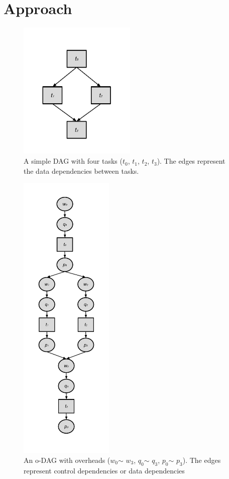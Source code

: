 \section{Approach}

\begin{figure}[h!]
	\centering
    \includegraphics[width=0.5\textwidth]{figures/model/dag.pdf}
    \caption{A simple DAG with four tasks ($t_0$, $t_1$, $t_2$, $t_3$). The edges represent the data dependencies between tasks.}
    \label{fig:model_dag}
\end{figure}

\begin{figure}[h!]
	\centering
    \includegraphics[width=0.4\textwidth]{figures/model/odag_before.pdf}
    \caption{An o-DAG with overheads ($w_0$$\sim$  $w_3$, $q_0$$\sim$  $q_3$, $p_0$$\sim$  $p_3$). The edges represent control dependencies or data dependencies}
    \label{fig:model_odag_before}
\end{figure}


